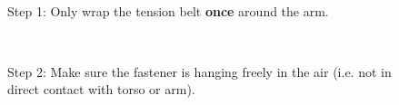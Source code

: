 \begin{figure}[h!]
\centering
\mbox{\quad
{}}
\caption{Step 1: Only wrap the tension belt {\bf once} around the arm.} %
\end{figure}

\begin{figure}[h!]
\centering
\mbox{\quad
{}}
\caption{Step 2: Make sure the fastener is hanging freely in the air (i.e. not in direct contact with torso or arm).} %
\end{figure}

